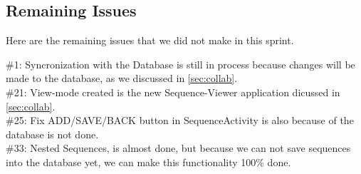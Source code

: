 \subsection{Remaining Issues}
\label{subsec:spr2_RemainingIssues}
Here are the remaining issues that we did not make in this sprint.

\#1: Syncronization with the Database is still in process because changes will be made to the database, as we discussed in \ref{sec:collab}. \\
\#21: View-mode created is the new Sequence-Viewer application dicussed in \ref{sec:collab}.\\
\#25: Fix ADD/SAVE/BACK button in SequenceActivity is also because of the database is not done.\\
\#33: Nested Sequences, is almost done, but because we can not save sequences into the database yet, we can make this functionality 100\% done.\\